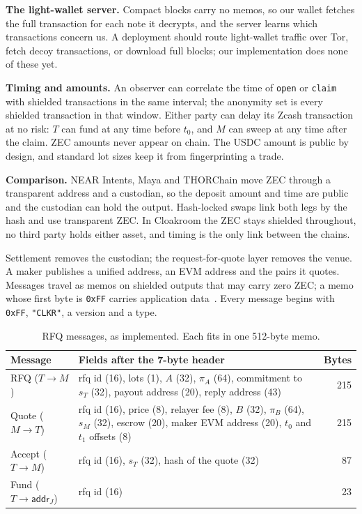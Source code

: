 \documentclass[10pt,letterpaper]{article}
\makeatletter
\renewcommand\section{\@startsection{section}{1}{\z@}{-1.3em}{0.45em}{\normalfont\large\bfseries}}
\newcommand{\fn}[1]{\texttt{#1}}
\makeatother
\begin{document}
\textbf{The light-wallet server.} Compact blocks carry no memos, so our wallet fetches the full
transaction for each note it decrypts, and the server learns which transactions concern us. A
deployment should route light-wallet traffic over Tor, fetch decoy transactions, or download full
blocks; our implementation does none of these yet.

\textbf{Timing and amounts.} An observer can correlate the time of \fn{open} or \fn{claim} with
shielded transactions in the same interval; the anonymity set is every shielded transaction in that
window. Either party can delay its Zcash transaction at no risk: $T$ can fund at any time before
$t_0$, and $M$ can sweep at any time after the claim. ZEC amounts never appear on chain. The USDC
amount is public by design, and standard lot sizes keep it from fingerprinting a trade.

\textbf{Comparison.} NEAR Intents, Maya and THORChain move ZEC through a transparent address and a
custodian, so the deposit amount and time are public and the custodian can hold the output.
Hash-locked swaps link both legs by the hash and use transparent ZEC. In Cloakroom the ZEC stays
shielded throughout, no third party holds either asset, and timing is the only link between the
chains.

\section{The Dark Pool}

Settlement removes the custodian; the request-for-quote layer removes the venue. A maker publishes a
unified address, an EVM address and the pairs it quotes. Messages travel as memos on shielded outputs
that may carry zero ZEC; a memo whose first byte is \texttt{0xFF} carries application
data~\cite{zip302}. Every message begins with \texttt{0xFF}, \texttt{"CLKR"}, a version and a type.

\begin{table}[H]
\centering\small
\begin{tabularx}{\linewidth}{@{}lX r@{}}
\toprule
\textbf{Message} & \textbf{Fields after the 7-byte header} & \textbf{Bytes}\\
\midrule
\textsf{RFQ} ($T\to M$) & rfq id (16), lots (1), $A$ (32), $\pi_A$ (64), commitment to $s_T$ (32), payout address (20), reply address (43) & 215\\
\textsf{Quote} ($M\to T$) & rfq id (16), price (8), relayer fee (8), $B$ (32), $\pi_B$ (64), $s_M$ (32), escrow (20), maker EVM address (20), $t_0$ and $t_1$ offsets (8) & 215\\
\textsf{Accept} ($T\to M$) & rfq id (16), $s_T$ (32), hash of the quote (32) & 87\\
\textsf{Fund} ($T\to\mathsf{addr}_J$) & rfq id (16) & 23\\
\bottomrule
\end{tabularx}
\caption{RFQ messages, as implemented. Each fits in one 512-byte memo.}
\end{table}
\end{document}
